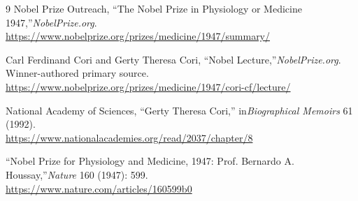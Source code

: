 \begin{thebibliography}{9}
Nobel Prize Outreach, ``The Nobel Prize in Physiology or Medicine 1947,''\emph{NobelPrize.org}.\\
\url{https://www.nobelprize.org/prizes/medicine/1947/summary/}

Carl Ferdinand Cori and Gerty Theresa Cori, ``Nobel Lecture,''\emph{NobelPrize.org}. Winner-authored primary source.\\
\url{https://www.nobelprize.org/prizes/medicine/1947/cori-cf/lecture/}

National Academy of Sciences, ``Gerty Theresa Cori,'' in\emph{Biographical Memoirs} 61 (1992).\\
\url{https://www.nationalacademies.org/read/2037/chapter/8}

``Nobel Prize for Physiology and Medicine, 1947: Prof. Bernardo A. Houssay,''\emph{Nature} 160 (1947): 599.\\
\url{https://www.nature.com/articles/160599b0}
\end{thebibliography}
